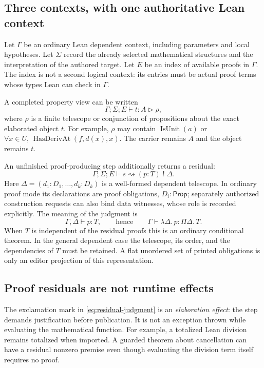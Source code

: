 \documentclass[11pt,a4paper]{article}
\theoremstyle{plain}
\theoremstyle{definition}
\theoremstyle{remark}
\begin{document}
\subsection{Three contexts, with one authoritative Lean context}
Let $\Gamma$ be an ordinary Lean dependent context, including parameters and local hypotheses. Let $\Sigma$ record the already selected mathematical structures and the interpretation of the authored target. Let $E$ be an index of available proofs in $\Gamma$. The index is not a second logical context: its entries must be actual proof terms whose types Lean can check in $\Gamma$.

A completed property view can be written
\[
 \Gamma;\Sigma;E\vdash t:A\triangleright \rho,
\]
where $\rho$ is a finite telescope or conjunction of propositions about the exact elaborated object $t$. For example, $\rho$ may contain $\operatorname{IsUnit}(a)$ or $\forall x\in U,\,\operatorname{HasDerivAt}(f,d(x),x)$. The carrier remains $A$ and the object remains $t$.

An unfinished proof-producing step additionally returns a residual:
\begin{equation}\label{eq:residual-judgment}
 \Gamma;\Sigma;E\vdash s\rightsquigarrow(p:T)\;!\;\Delta.
\end{equation}
Here $\Delta=(d_1:D_1,\ldots,d_k:D_k)$ is a well-formed dependent telescope. In ordinary proof mode its declarations are proof obligations, $D_i:\mathsf{Prop}$; separately authorized construction requests can also bind data witnesses, whose role is recorded explicitly. The meaning of the judgment is
\begin{equation}\label{eq:residual-semantics}
 \Gamma,\Delta\vdash p:T,
 \qquad\text{hence}\qquad
 \Gamma\vdash \lambda\Delta.\,p:\Pi\Delta.\,T.
\end{equation}
When $T$ is independent of the residual proofs this is an ordinary conditional theorem. In the general dependent case the telescope, its order, and the dependencies of $T$ must be retained. A flat unordered set of printed obligations is only an editor projection of this representation.

\subsection{Proof residuals are not runtime effects}
The exclamation mark in \eqref{eq:residual-judgment} is an \emph{elaboration effect}: the step demands justification before publication. It is not an exception thrown while evaluating the mathematical function. For example, a totalized Lean division remains totalized when imported. A guarded theorem about cancellation can have a residual nonzero premise even though evaluating the division term itself requires no proof.
\end{document}
